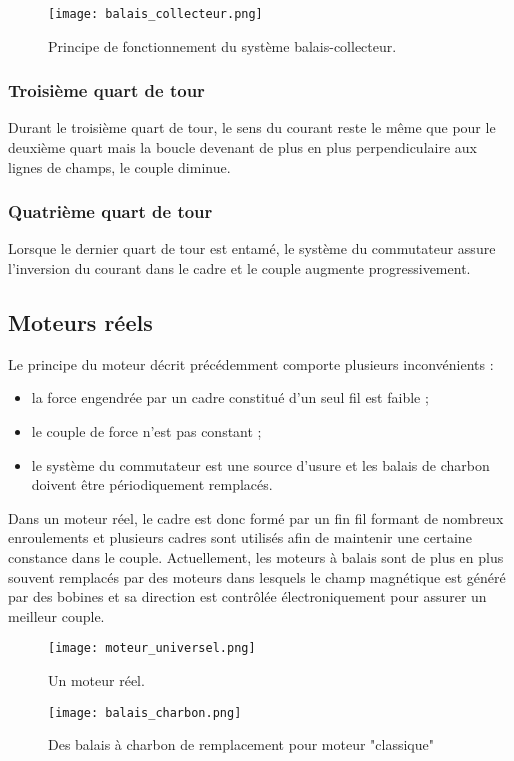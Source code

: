 \begin{figure}[ht]
    \centering
    \texttt{[image: balais\_collecteur.png]}
    \caption{Principe de fonctionnement du système balais-collecteur.}
    \label{balais_collecteur}
\end{figure}

\subsubsection*{Troisième quart de tour}
Durant le troisième quart de tour, le sens du courant reste le même que pour le deuxième quart mais la boucle devenant de plus en plus perpendiculaire aux lignes de champs, le couple diminue.


\subsubsection*{Quatrième quart de tour}
Lorsque le dernier quart de tour est entamé, le système du commutateur assure l'inversion du courant dans le cadre et le couple augmente progressivement.

\subsection{Moteurs réels}
Le principe du moteur décrit précédemment comporte plusieurs inconvénients :
\begin{itemize}[label=\textbullet]
    \item la force engendrée par un cadre constitué d'un seul fil est faible ;
    \item le couple de force n'est pas constant ;
    \item le système du commutateur est une source d'usure et les balais de charbon doivent être périodiquement remplacés.
\end{itemize}

\newpage

Dans un moteur réel, le cadre est donc formé par un fin fil formant de nombreux enroulements et plusieurs cadres sont utilisés afin de maintenir une certaine constance dans le couple.
Actuellement, les moteurs à balais sont de plus en plus souvent remplacés par des moteurs  dans lesquels le champ magnétique est généré par des bobines et sa direction est contrôlée électroniquement pour assurer un meilleur couple.



\begin{figure}[!ht]
    \centering
    \begin{minipage}[b]{.47\linewidth}
        \centering
        \texttt{[image: moteur\_universel.png]}
        \caption{Un moteur réel.}
        \label{moteur_reel}
    \end{minipage}
    \begin{minipage}[b]{.47\linewidth}
        \centering
        \texttt{[image: balais\_charbon.png]}
        \caption{Des balais à charbon de remplacement pour moteur "classique"}
        \label{balais_charbon}
    \end{minipage}
\end{figure}


